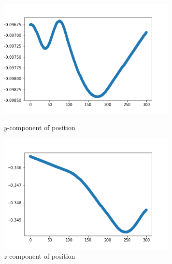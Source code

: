 \documentclass[12pt]{article}
\begin{document}
	\begin{figure}[H]
		\begin{multicols}{2}
			\includegraphics[width=\linewidth, height=6cm]{psy3.png} \caption{$y$-component of position} \label{psy3} \par
			\includegraphics[width=\linewidth, height=6cm]{psz3.png} \caption{$z$-component of position} \label{psz3} \par
		\end{multicols}
	\end{figure}
	
\end{document}
